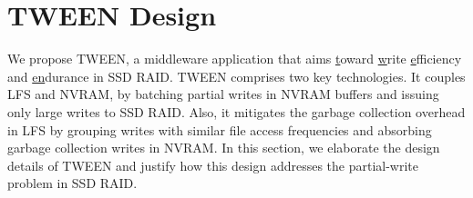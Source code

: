 \section{TWEEN Design}
\label{sec:tween_design}

We propose TWEEN, a middleware application that aims \underline{t}oward
\underline{w}rite \underline{e}fficiency and \underline{en}durance in SSD
RAID.  TWEEN comprises two key technologies.  It couples LFS and NVRAM, by
batching partial writes in NVRAM buffers and issuing only large writes to SSD
RAID.  Also, it mitigates the garbage collection overhead in LFS by grouping
writes with similar file access frequencies and absorbing garbage collection
writes in NVRAM.  In this section, we elaborate the design details of
TWEEN and justify how this design addresses the partial-write problem in SSD
RAID.  


%


